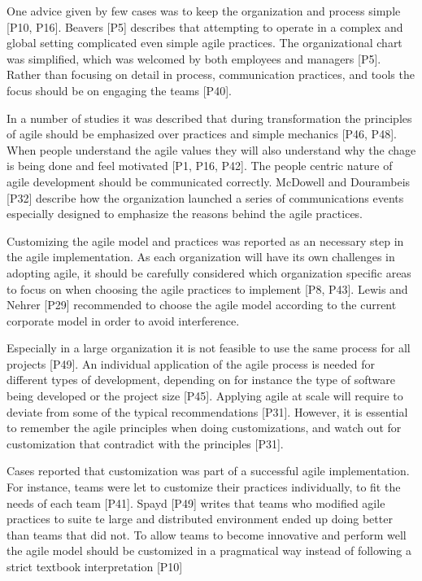 \documentclass[preprint,authoryear,12pt]{elsarticle}
\begin{document}

One advice given by few cases was to keep the organization and process simple
[P10, P16]. Beavers [P5] describes that attempting to operate in a complex and
global setting complicated even simple agile practices. The organizational chart
was simplified, which was welcomed by both employees and managers [P5]. Rather
than focusing on detail in process, communication practices, and tools the focus
should be on engaging the teams [P40].


In a number of studies it was described that during transformation the
principles of agile should be emphasized over practices and simple mechanics
[P46, P48]. When people understand the agile values they will also understand
why the chage is being done and feel motivated [P1, P16, P42].
The people centric nature of agile development should be communicated correctly.
McDowell and Dourambeis [P32] describe how the organization launched a series of
communications events especially designed to emphasize the reasons behind the
agile practices.


Customizing the agile model and practices was reported as an necessary step in
the agile implementation. As each organization will have its own challenges in
adopting agile, it should be carefully considered which organization specific
areas to focus on when choosing the agile practices to implement  [P8, P43].
Lewis and Nehrer [P29] recommended to choose the agile model according to the
current corporate model in order to avoid interference.

Especially in a large organization it is not feasible to use the same process
for all projects [P49]. An individual application of the agile process is needed
for different types of development, depending on for instance the type of
software being developed or the project size [P45].
Applying agile at scale will require to deviate from some of the typical
recommendations [P31]. However, it is essential to remember the agile principles
when doing customizations, and watch out for customization that contradict with
the principles [P31].

Cases reported that customization was part of a successful agile implementation.
For instance, teams were let to customize their practices individually, to fit
the needs of each team [P41].
Spayd [P49] writes that teams who modified agile practices to suite te large and
distributed environment ended up doing better than teams that did not.
To allow teams to become innovative and perform well the agile model should be
customized in a pragmatical way instead of following a strict textbook
interpretation [P10]
\end{document}
